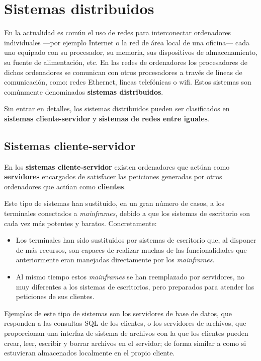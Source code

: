 \section{Sistemas distribuidos}\label{_sistemas_distribuidos}

{} En la actualidad es común el uso de redes para interconectar
ordenadores individuales ---por ejemplo Internet o la red de área local
de una oficina--- cada uno equipado con su procesador, su memoria, sus
dispositivos de almacenamiento, su fuente de alimentación, etc. En las
redes de ordenadores los procesadores de dichos ordenadores se comunican
con otros procesadores a través de líneas de comunicación, como: redes
Ethernet, líneas telefónicas o wifi. Estos sistemas son comúnmente
denominados \textbf{sistemas distribuidos}.

Sin entrar en detalles, los sistemas distribuidos pueden ser
clasificados en \textbf{sistemas cliente-servidor} y \textbf{sistemas de
redes entre iguales}.

\subsection{Sistemas cliente-servidor}\label{_sistemas_cliente_servidor}

En los \textbf{sistemas {}cliente-servidor} {} existen ordenadores que
actúan como \textbf{servidores} encargados de satisfacer las peticiones
generadas por otros ordenadores que actúan como \textbf{clientes}.

Este tipo de sistemas han sustituido, en un gran número de casos, a los
terminales conectados a \emph{mainframes}, debido a que los sistemas de
escritorio son cada vez más potentes y baratos. Concretamente:

\begin{itemize}
\item
  Los terminales han sido sustituidos por sistemas de escritorio que, al
  disponer de más recursos, son capaces de realizar muchas de las
  funcionalidades que anteriormente eran manejadas directamente por los
  \emph{mainframes}.
\item
  Al mismo tiempo estos \emph{mainframes} se han reemplazado por
  servidores, no muy diferentes a los sistemas de escritorios, pero
  preparados para atender las peticiones de sus clientes.
\end{itemize}

Ejemplos de este tipo de sistemas son los servidores de base de datos,
que responden a las consultas SQL de los clientes, o los servidores de
archivos, que proporcionan una interfaz de sistema de archivos con la
que los clientes pueden crear, leer, escribir y borrar archivos en el
servidor; de forma similar a como si estuvieran almacenados localmente
en el propio cliente.

